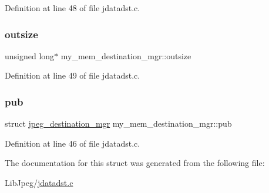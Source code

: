 Definition at line 48 of file jdatadst.\+c.

\mbox{\label{structmy__mem__destination__mgr_ac4bcefbee84e8b603a57dbb347cc2351}} 
\subsubsection{\texorpdfstring{outsize}{outsize}}
{\footnotesize\ttfamily unsigned long$\ast$ my\+\_\+mem\+\_\+destination\+\_\+mgr\+::outsize}



Definition at line 49 of file jdatadst.\+c.

\mbox{\label{structmy__mem__destination__mgr_a5e0cd1a96147d183b7338007a7716961}} 
\subsubsection{\texorpdfstring{pub}{pub}}
{\footnotesize\ttfamily struct \mbox{\hyperlink{structjpeg__destination__mgr}{jpeg\+\_\+destination\+\_\+mgr}} my\+\_\+mem\+\_\+destination\+\_\+mgr\+::pub}



Definition at line 46 of file jdatadst.\+c.



The documentation for this struct was generated from the following file\+:\begin{DoxyCompactItemize}
\item 
Lib\+Jpeg/\mbox{\hyperlink{jdatadst_8c}{jdatadst.\+c}}\end{DoxyCompactItemize}
